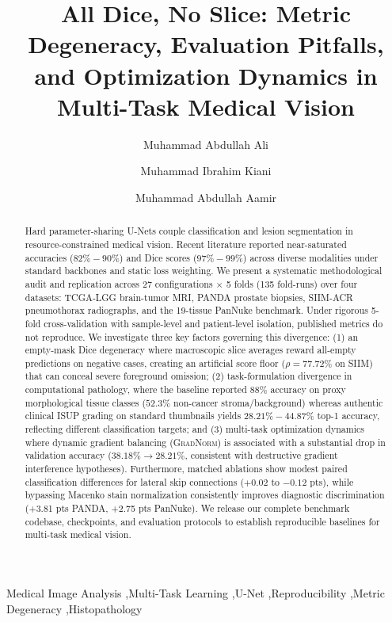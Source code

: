 \documentclass[preprint,12pt]{elsarticle}
\begin{document}
\begin{frontmatter}

\title{All Dice, No Slice: Metric Degeneracy, Evaluation Pitfalls, and Optimization Dynamics in Multi-Task Medical Vision}

\author[fast]{Muhammad Abdullah Ali\texorpdfstring{}{}}
\author[fast]{Muhammad Ibrahim Kiani}
\author[fast]{Muhammad Abdullah Aamir}


\begin{abstract}
Hard parameter-sharing U-Nets couple classification and lesion segmentation in resource-constrained medical vision. Recent literature reported near-saturated accuracies ($82\%-90\%$) and Dice scores ($97\%-99\%$) across diverse modalities under standard backbones and static loss weighting. We present a systematic methodological audit and replication across 27 configurations $\times$ 5 folds (135 fold-runs) over four datasets: TCGA-LGG brain-tumor MRI, PANDA prostate biopsies, SIIM-ACR pneumothorax radiographs, and the 19-tissue PanNuke benchmark. Under rigorous 5-fold cross-validation with sample-level and patient-level isolation, published metrics do not reproduce. We investigate three key factors governing this divergence: (1) an empty-mask Dice degeneracy where macroscopic slice averages reward all-empty predictions on negative cases, creating an artificial score floor ($\rho = 77.72\%$ on SIIM) that can conceal severe foreground omission; (2) task-formulation divergence in computational pathology, where the baseline reported $88\%$ accuracy on proxy morphological tissue classes ($52.3\%$ non-cancer stroma/background) whereas authentic clinical ISUP grading on standard thumbnails yields $28.21\%-44.87\%$ top-1 accuracy, reflecting different classification targets; and (3) multi-task optimization dynamics where dynamic gradient balancing (\textsc{GradNorm}) is associated with a substantial drop in validation accuracy ($38.18\% \to 28.21\%$, consistent with destructive gradient interference hypotheses). Furthermore, matched ablations show modest paired classification differences for lateral skip connections ($+0.02$ to $-0.12$ pts), while bypassing Macenko stain normalization consistently improves diagnostic discrimination (+3.81 pts PANDA, +2.75 pts PanNuke). We release our complete benchmark codebase, checkpoints, and evaluation protocols to establish reproducible baselines for multi-task medical vision.
\end{abstract}

\begin{keyword}
Medical Image Analysis \sep Multi-Task Learning \sep U-Net \sep Reproducibility \sep Metric Degeneracy \sep Histopathology
\end{keyword}

\end{frontmatter}
\end{document}
